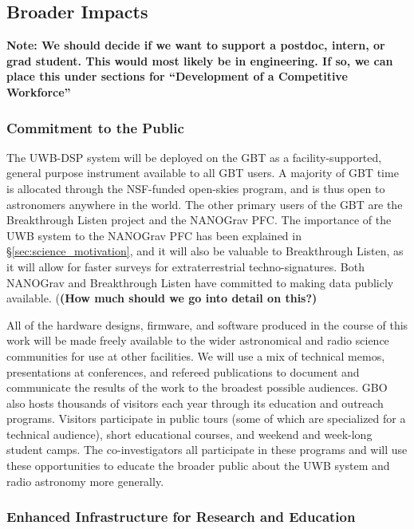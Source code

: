 \documentclass[10pt]{myNSF}
\begin{document}
\subsection{Broader Impacts}
\label{sec:BI}

\textbf{Note: We should decide if we want to support a postdoc,
  intern, or grad student.  This would most likely be in engineering.
  If so, we can place this under sections for ``Development of a
  Competitive Workforce''}

\subsubsection{Commitment to the Public}
\label{sec:commitment}

The UWB-DSP system will be deployed on the GBT as a
facility-supported, general purpose instrument available to all GBT
users.  A majority of GBT time is allocated through the NSF-funded
open-skies program, and is thus open to astronomers anywhere in the
world.  The other primary users of the GBT are the Breakthrough Listen
project and the NANOGrav PFC.  The importance of the UWB system to the
NANOGrav PFC has been explained in \S\ref{sec:science_motivation}, and
it will also be valuable to Breakthrough Listen, as it will allow for
faster surveys for extraterrestrial techno-signatures.  Both NANOGrav
and Breakthrough Listen have committed to making data publicly
available. (\textbf{(How much should we go into detail on this?)}

All of the hardware designs, firmware, and software produced in the
course of this work will be made freely available to the wider
astronomical and radio science communities for use at other
facilities.  We will use a mix of technical memos, presentations at
conferences, and refereed publications to document and communicate the
results of the work to the broadest possible audiences.  GBO also
hosts thousands of visitors each year through its education and
outreach programs.  Visitors participate in public tours (some of
which are specialized for a technical audience), short educational
courses, and weekend and week-long student camps.  The
co-investigators all participate in these programs and will use these
opportunities to educate the broader public about the UWB system and
radio astronomy more generally.

\subsubsection{Enhanced Infrastructure for Research and Education}
\label{sec:infrastructure}
\end{document}
